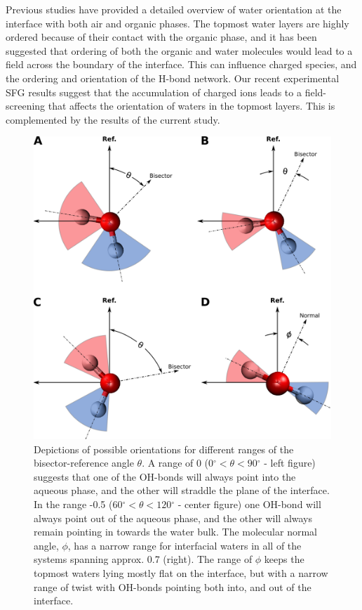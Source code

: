 Previous studies have provided a detailed overview of water orientation at the interface with both air and organic phases.\cite{McFearin2009,Hore2008,Fan2009,Wick2006c,Wick2008a} The topmost water layers are highly ordered because of their contact with the organic phase, and it has been suggested that ordering of both the organic and water molecules would lead to a field across the boundary of the interface.\cite{McFearin2009,Hore2008} This can influence charged species, and the ordering and orientation of the H-bond network. Our recent experimental SFG results suggest that the accumulation of charged ions leads to a field-screening that affects the orientation of waters in the topmost layers. This is complemented by the results of the current study.

\newcommand{\degree}{\ensuremath{^\circ}}

\begin{figure}[h!]
\begin{center}
	\includegraphics[scale=0.26]{images/h2o-angle-ranges.png}
	\caption{Depictions of possible orientations for different ranges of the bisector-reference angle $\theta$. A range of 0 ($0\degree<\theta<90\degree$ - left figure) suggests that one of the OH-bonds will always point into the aqueous phase, and the other will straddle the plane of the interface. In the range -0.5 ($60\degree<\theta<120\degree$ - center figure) one OH-bond will always point out of the aqueous phase, and the other will always remain pointing in towards the water bulk. The molecular normal angle, $\phi$, has a narrow range for interfacial waters in all of the systems spanning approx. 0.7 (right). The range of $\phi$ keeps the topmost waters lying mostly flat on the interface, but with a narrow range of twist with OH-bonds pointing both into, and out of the interface.}
	\label{fig:angle-ranges}
\end{center}
\end{figure}

